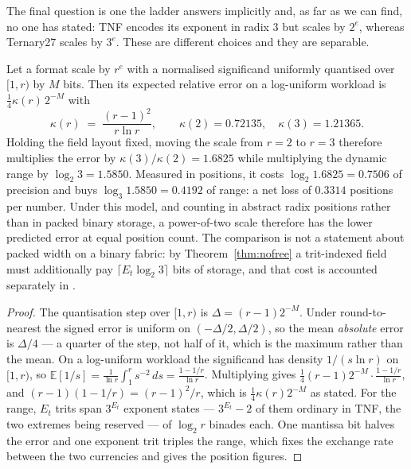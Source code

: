 The final question is one the ladder answers implicitly and, as far as we can
find, no one has stated: TNF encodes its exponent in radix 3 but scales by
$2^{e}$, whereas Ternary27 scales by $3^{e}$. These are different choices and
they are separable.

\begin{theorem}[Scale radix: under the log-uniform model at fixed field layout,
$r=2$ has lower relative error than $r=3$]
\label{thm:scaleradix}
Let a format scale by $r^{e}$ with a normalised significand uniformly quantised
over $[1, r)$ by $M$ bits. Then its expected relative error on a log-uniform
workload is $\tfrac14\kappa(r)\,2^{-M}$ with
\[
\kappa(r) \;=\; \frac{(r-1)^{2}}{r\ln r},
\qquad \kappa(2) = 0.72135,\quad \kappa(3) = 1.21365 .
\]
Holding the field layout fixed, moving the scale from $r=2$ to $r=3$ therefore
multiplies the error by $\kappa(3)/\kappa(2) = 1.6825$ while multiplying the
dynamic range by $\log_2 3 = 1.5850$. Measured in positions, it costs
$\log_2 1.6825 = 0.7506$ of precision and buys $\log_3 1.5850 = 0.4192$ of range:
a net loss of $0.3314$ positions per number. Under this model, and counting in
abstract radix positions rather than in packed binary storage, a power-of-two
scale therefore has the lower predicted error at equal position count. The
comparison is not a statement about packed width on a binary fabric: by
Theorem~\ref{thm:nofree} a trit-indexed field must additionally pay
$\lceil E_t\log_2 3\rceil$ bits of storage, and that cost is accounted separately
in .
\end{theorem}

\begin{proof}
The quantisation step over $[1,r)$ is $\Delta = (r-1)2^{-M}$. Under
round-to-nearest the signed error is uniform on $(-\Delta/2, \Delta/2)$, so the
mean \emph{absolute} error is $\Delta/4$ --- a quarter of the step, not half of
it, which is the maximum rather than the mean. On a log-uniform workload the
significand has density $1/(s\ln r)$ on $[1,r)$, so
$\mathbb{E}[1/s] = \frac{1}{\ln r}\int_1^{r} s^{-2}\,ds = \frac{1-1/r}{\ln r}$.
Multiplying gives $\tfrac14 (r-1)2^{-M}\cdot\frac{1-1/r}{\ln r}$, and
$(r-1)(1-1/r) = (r-1)^2/r$, which is $\tfrac14\kappa(r)2^{-M}$ as stated. For
the range, $E_t$ trits span $3^{E_t}$ exponent states --- $3^{E_t}-2$ of them
ordinary in TNF, the two extremes being reserved --- of $\log_2 r$ binades each. One
mantissa bit halves the error and one exponent trit triples the range, which
fixes the exchange rate between the two currencies and gives the position
figures.
\end{proof}

